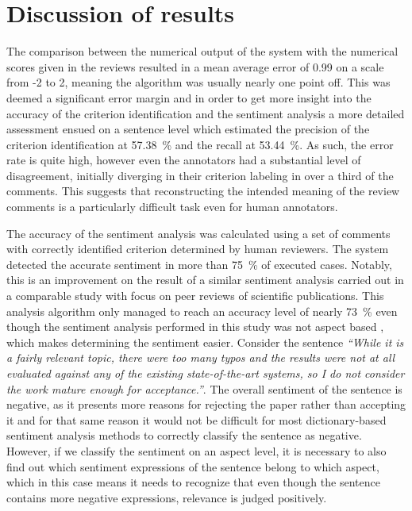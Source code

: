\section{Discussion of results}

The comparison between the numerical output of the system with the numerical scores given in the reviews resulted in a mean average error of 0.99 on a scale from -2 to 2, meaning the algorithm was usually nearly one point off. This was deemed a significant error margin and in order to get more insight into the accuracy of the criterion identification and the sentiment analysis a more detailed assessment ensued on a sentence level which estimated the precision of the criterion identification at 57.38~\% and the recall at 53.44~\%. As such, the error rate is quite high, however even the annotators had a substantial level of disagreement, initially diverging in their criterion labeling in over a third of the comments. This suggests that reconstructing the intended meaning of the review comments is a particularly difficult task even for human annotators.

The accuracy of the sentiment analysis was calculated using a set of comments with correctly identified criterion determined by human reviewers. The system detected the accurate sentiment in more than 75~\% of executed cases. Notably, this is an improvement on the result of a similar sentiment analysis carried out in a comparable study with focus on peer reviews of scientific publications. This analysis algorithm only managed to reach an accuracy level of nearly 73~\% even though the sentiment analysis performed in this study was not aspect based \cite{nano_peer}, which makes determining the sentiment easier. Consider the sentence \textit{``While it is a fairly relevant topic, there were too many typos and the results were not at all evaluated against any of the existing state-of-the-art systems, so I do not consider the work mature enough for acceptance.''}.  The overall sentiment of the sentence is negative, as it presents more reasons for rejecting the paper rather than accepting it and for that same reason it would not be difficult for most dictionary-based sentiment analysis methods to correctly classify the sentence as negative. However, if we classify the sentiment on an aspect level, it is necessary to also find out which sentiment expressions of the sentence belong to which aspect, which in this case means it needs to recognize that even though the sentence contains more negative expressions, relevance is judged positively. 


